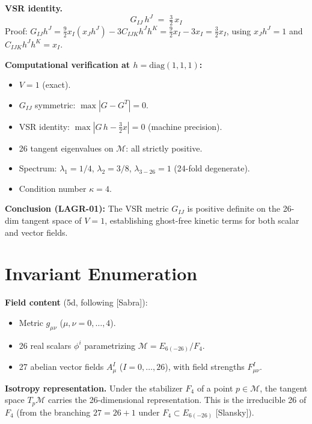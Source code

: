 \textbf{VSR identity.}
\begin{equation}\label{eq:53.4}
  G_{IJ}\,h^J \;=\; \tfrac{3}{2}\,x_I
\end{equation}
Proof: $G_{IJ}h^J = \tfrac{9}{2}x_I(x_J h^J) - 3C_{IJK}h^Jh^K
= \tfrac{9}{2}x_I - 3x_I = \tfrac{3}{2}x_I$,
using $x_J h^J = 1$ and $C_{IJK}h^Jh^K = x_I$.

\textbf{Computational verification at $h = \mathrm{diag}(1,1,1)$:}
\begin{itemize}
  \item $V = 1$ (exact).
  \item $G_{IJ}$ symmetric: $\max|G - G^T| = 0$.
  \item VSR identity: $\max|G\,h - \tfrac{3}{2}x| = 0$ (machine precision).
  \item 26 tangent eigenvalues on $\mathcal{M}$: all strictly positive.
  \item Spectrum: $\lambda_1 = 1/4$, $\lambda_2 = 3/8$,
        $\lambda_{3{-}26} = 1$ (24-fold degenerate).
  \item Condition number $\kappa = 4$.
\end{itemize}

\textbf{Conclusion (LAGR-01):} The VSR metric $G_{IJ}$ is positive definite
on the 26-dim tangent space of $V=1$, establishing ghost-free kinetic terms
for both scalar and vector fields.



\section{Invariant Enumeration}

\textbf{Field content} (5d, following [Sabra]):
\begin{itemize}
  \item Metric $g_{\mu\nu}$ ($\mu,\nu = 0,\ldots,4$).
  \item 26 real scalars $\phi^i$ parametrizing $\mathcal{M} = E_{6(-26)}/F_4$.
  \item 27 abelian vector fields $A^I_\mu$ ($I = 0,\ldots,26$),
        with field strengths $F^I_{\mu\nu}$.
\end{itemize}

\textbf{Isotropy representation.} Under the stabilizer $F_4$ of a point
$p \in \mathcal{M}$, the tangent space $T_p\mathcal{M}$ carries the
26-dimensional representation. This is the irreducible 26 of $F_4$
(from the branching $27 = 26 + 1$ under $F_4 \subset E_{6(-26)}$ [Slansky]).

